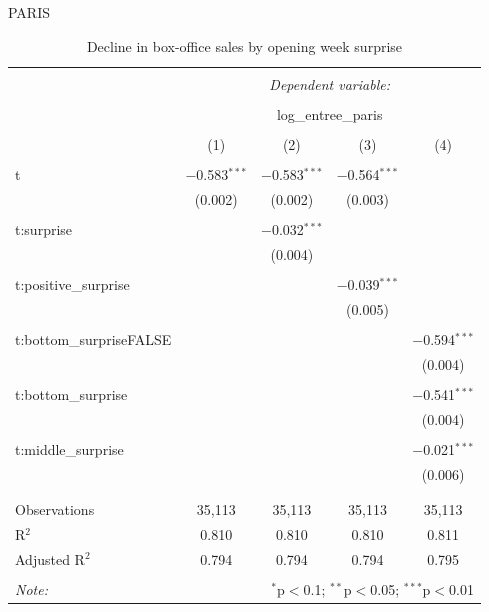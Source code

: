 PARIS

\begin{table}[!htbp] \centering 
	\caption{Decline in box-office sales by opening week surprise} 
	\label{} 
	\begin{tabular}{@{\extracolsep{5pt}}lcccc} 
		\\[-1.8ex]\hline 
		\hline \\[-1.8ex] 
		& \multicolumn{4}{c}{\textit{Dependent variable:}} \\ 
		\cline{2-5} 
		\\[-1.8ex] & \multicolumn{4}{c}{log\_entree\_paris} \\ 
		\\[-1.8ex] & (1) & (2) & (3) & (4)\\ 
		\hline \\[-1.8ex] 
		t & $-$0.583$^{***}$ & $-$0.583$^{***}$ & $-$0.564$^{***}$ &  \\ 
		& (0.002) & (0.002) & (0.003) &  \\ 
		& & & & \\ 
		t:surprise &  & $-$0.032$^{***}$ &  &  \\ 
		&  & (0.004) &  &  \\ 
		& & & & \\ 
		t:positive\_surprise &  &  & $-$0.039$^{***}$ &  \\ 
		&  &  & (0.005) &  \\ 
		& & & & \\ 
		t:bottom\_surpriseFALSE &  &  &  & $-$0.594$^{***}$ \\ 
		&  &  &  & (0.004) \\ 
		& & & & \\ 
		t:bottom\_surprise &  &  &  & $-$0.541$^{***}$ \\ 
		&  &  &  & (0.004) \\ 
		& & & & \\ 
		t:middle\_surprise &  &  &  & $-$0.021$^{***}$ \\ 
		&  &  &  & (0.006) \\ 
		& & & & \\ 
		\hline \\[-1.8ex] 
		Observations & 35,113 & 35,113 & 35,113 & 35,113 \\ 
		R$^{2}$ & 0.810 & 0.810 & 0.810 & 0.811 \\ 
		Adjusted R$^{2}$ & 0.794 & 0.794 & 0.794 & 0.795 \\ 
		\hline 
		\hline \\[-1.8ex] 
		\textit{Note:}  & \multicolumn{4}{r}{$^{*}$p$<$0.1; $^{**}$p$<$0.05; $^{***}$p$<$0.01} \\ 
	\end{tabular} 
\end{table} 

